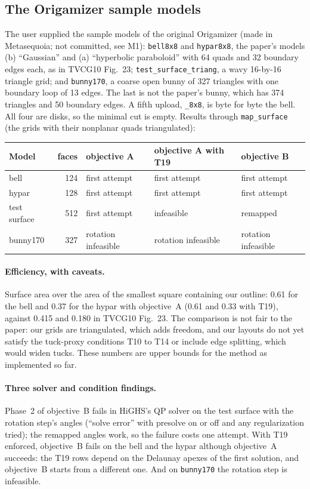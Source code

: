 \documentclass[11pt]{article}
\theoremstyle{definition}
\begin{document}
\subsection{The Origamizer sample models}

The user supplied the sample models of the original Origamizer (made in
Metasequoia; not committed, see M1): \texttt{bell8x8} and
\texttt{hypar8x8}, the paper's models (b) ``Gaussian'' and (a) ``hyperbolic
paraboloid'' with 64 quads and 32 boundary edges each, as in TVCG10 Fig.~23;
\texttt{test\_surface\_triang}, a wavy 16-by-16 triangle grid; and
\texttt{bunny170}, a coarse open bunny of 327 triangles with one boundary loop
of 13 edges. The last is not the paper's bunny, which has 374 triangles and 50
boundary edges. A fifth upload, \texttt{\_8x8}, is byte for byte the bell. All
four are disks, so the minimal cut is empty. Results through
\texttt{map\_surface} (the grids with their nonplanar quads triangulated):

\begin{center}
\small
\begin{tabular}{@{}lrlll@{}}
\toprule
Model & faces & objective A & objective A with T19 & objective B \\
\midrule
bell & 124 & first attempt & first attempt & first attempt \\
hypar & 128 & first attempt & first attempt & first attempt \\
test surface & 512 & first attempt & infeasible & remapped \\
bunny170 & 327 & rotation infeasible & rotation infeasible & rotation infeasible \\
\bottomrule
\end{tabular}
\end{center}

\paragraph{Efficiency, with caveats.} Surface area over the area of the
smallest square containing our outline: 0.61 for the bell and 0.37 for the
hypar with objective~A (0.61 and 0.33 with T19), against 0.415 and 0.180 in
TVCG10 Fig.~23. The comparison is not fair to the paper: our grids are
triangulated, which adds freedom, and our layouts do not yet satisfy the
tuck-proxy conditions T10 to T14 or include edge splitting, which would widen
tucks. These numbers are upper bounds for the method as implemented so far.

\paragraph{Three solver and condition findings.} Phase~2 of objective~B fails
in HiGHS's QP solver on the test surface with the rotation step's angles
(``solve error'' with presolve on or off and any regularization tried); the
remapped angles work, so the failure costs one attempt. With T19 enforced,
objective~B fails on the bell and the hypar although objective~A succeeds:
the T19 rows depend on the Delaunay apexes of the first solution, and
objective~B starts from a different one. And on \texttt{bunny170} the rotation
step is infeasible.
\end{document}
